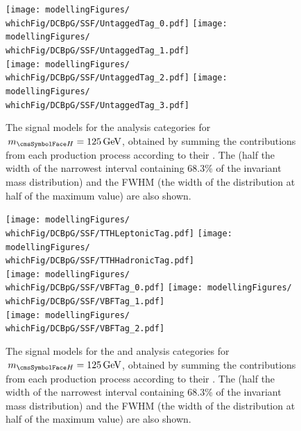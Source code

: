 \begin{figure}[htp!]
\centering
\texttt{[image: modellingFigures/\\whichFig/DCBpG/SSF/UntaggedTag\_0.pdf]} 
\texttt{[image: modellingFigures/\\whichFig/DCBpG/SSF/UntaggedTag\_1.pdf]} \\
\texttt{[image: modellingFigures/\\whichFig/DCBpG/SSF/UntaggedTag\_2.pdf]} 
\texttt{[image: modellingFigures/\\whichFig/DCBpG/SSF/UntaggedTag\_3.pdf]} \\ 

\caption{The signal models for the \Untagged analysis categories for $\mH=125\GeV$, obtained by summing the contributions from each production process according to their \effxacc. The \effSigma (half the width of the narrowest interval containing 68.3\% of the invariant mass distribution) and the FWHM (the width of the distribution at half of the maximum value) are also shown.}

\label{fig:model:sig_model_per_category}
\end{figure}

\begin{figure}[htp!]
\centering
\texttt{[image: modellingFigures/\\whichFig/DCBpG/SSF/TTHLeptonicTag.pdf]} 
\texttt{[image: modellingFigures/\\whichFig/DCBpG/SSF/TTHHadronicTag.pdf]} \\
\texttt{[image: modellingFigures/\\whichFig/DCBpG/SSF/VBFTag\_0.pdf]} 
\texttt{[image: modellingFigures/\\whichFig/DCBpG/SSF/VBFTag\_1.pdf]}\\ 
\ifNewAnalysis
\texttt{[image: modellingFigures/\\whichFig/DCBpG/SSF/VBFTag\_2.pdf]} 
\fi
\caption{The signal models for the \VBFTag and \TTHTag analysis categories for $\mH=125\GeV$, obtained by summing the contributions from each production process according to their \effxacc. The \effSigma (half the width of the narrowest interval containing 68.3\% of the invariant mass distribution) and the FWHM (the width of the distribution at half of the maximum value) are also shown.}

\label{fig:model:sig_model_per_category_bis}
\end{figure}

